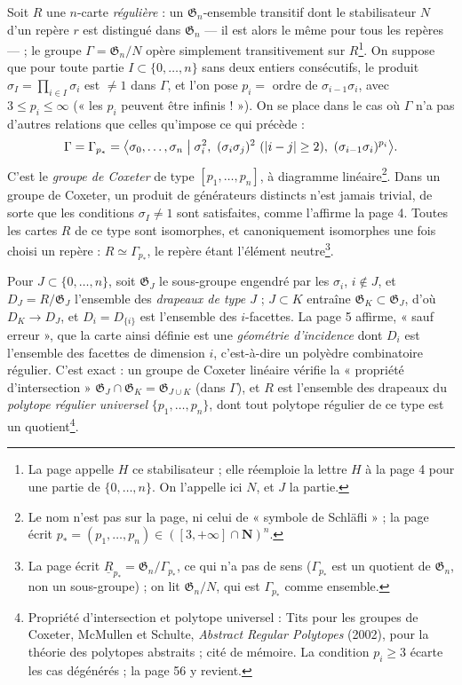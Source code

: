 \documentclass[11pt,a4paper]{article}
\begin{document}
Soit $R$ une $n$-carte \emph{régulière} : un $\mathfrak{G}_n$-ensemble transitif
dont le stabilisateur $N$ d'un repère $r$ est distingué dans $\mathfrak{G}_n$ ---
il est alors le même pour tous les repères --- ; le groupe $\Gamma =
\mathfrak{G}_n / N$ opère simplement transitivement sur $R$\footnote{La page
appelle $H$ ce stabilisateur ; elle réemploie la lettre $H$ à la page 4 pour
une partie de $\{0, \dots, n\}$. On l'appelle ici $N$, et $J$ la partie.}. On
suppose que pour toute partie $I \subset \{0, \dots, n\}$ sans deux entiers
consécutifs, le produit $\sigma_I = \prod_{i \in I} \sigma_i$ est $\neq 1$ dans
$\Gamma$, et l'on pose $p_i = $ ordre de $\sigma_{i-1}\sigma_i$, avec $3 \leq p_i
\leq \infty$ (« les $p_i$ peuvent être infinis ! »). On se place dans le cas
où $\Gamma$ n'a pas d'autres relations que celles qu'impose ce qui précède :
\[
\Gamma = \Gamma_{p_*} = \bigl\langle \sigma_0, \dots, \sigma_n \bigm|
\sigma_i^2,\ (\sigma_i\sigma_j)^2 \ (|i-j| \geq 2),\ (\sigma_{i-1}\sigma_i)^{p_i}
\bigr\rangle .
\]
C'est le \emph{groupe de Coxeter} de type $[p_1, \dots, p_n]$, à diagramme
linéaire\footnote{Le nom n'est pas sur la page, ni celui de « symbole de
Schläfli » ; la page écrit $p_* = (p_1, \dots, p_n) \in ([3, +\infty] \cap
\mathbf{N})^n$.}. Dans un groupe de Coxeter, un produit de générateurs
distincts n'est jamais trivial, de sorte que les conditions $\sigma_I \neq 1$
sont satisfaites, comme l'affirme la page 4. Toutes les cartes $R$ de ce type
sont isomorphes, et canoniquement isomorphes une fois choisi un repère : $R
\simeq \Gamma_{p_*}$, le repère étant l'élément neutre\footnote{La page écrit
$\underline{R}_{p_*} = \mathfrak{G}_n / \Gamma_{p_*}$, ce qui n'a pas de sens
($\Gamma_{p_*}$ est un quotient de $\mathfrak{G}_n$, non un sous-groupe) ; on lit
$\mathfrak{G}_n / N$, qui est $\Gamma_{p_*}$ comme ensemble.}.

Pour $J \subset \{0, \dots, n\}$, soit $\mathfrak{G}_J$ le sous-groupe engendré
par les $\sigma_i$, $i \notin J$, et $D_J = R / \mathfrak{G}_J$ l'ensemble des
\emph{drapeaux de type $J$} ; $J \subset K$ entraîne $\mathfrak{G}_K \subset
\mathfrak{G}_J$, d'où $D_K \to D_J$, et $D_i = D_{\{i\}}$ est l'ensemble des
$i$-facettes. La page 5 affirme, « sauf erreur », que la carte ainsi définie
est une \emph{géométrie d'incidence} dont $D_i$ est l'ensemble des facettes de
dimension $i$, c'est-à-dire un polyèdre combinatoire régulier. C'est exact :
un groupe de Coxeter linéaire vérifie la « propriété d'intersection »
$\mathfrak{G}_J \cap \mathfrak{G}_K = \mathfrak{G}_{J \cup K}$ (dans $\Gamma$),
et $R$ est l'ensemble des drapeaux du \emph{polytope régulier universel}
$\{p_1, \dots, p_n\}$, dont tout polytope régulier de ce type est un
quotient\footnote{Propriété d'intersection et polytope universel : Tits pour
les groupes de Coxeter, McMullen et Schulte, \emph{Abstract Regular
Polytopes} (2002), pour la théorie des polytopes abstraits ; cité de mémoire.
La condition $p_i \geq 3$ écarte les cas dégénérés ; la page 56 y revient.}.
\end{document}

